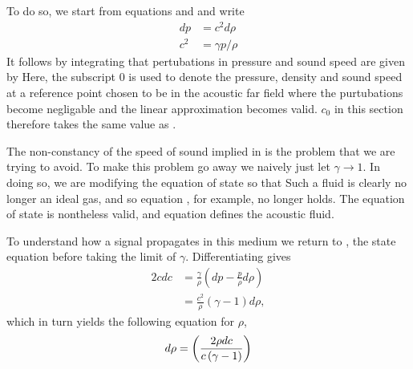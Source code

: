 To do so, we start from equations  and  and write
\begin{align}
  d p &= c^2 d\rho \label{eqn:soundSpeedDiffNR} \\
  c^2 &= \gamma p / \rho \label{eqn:idealGasSoundSpeed}
\end{align}
It follows by integrating that pertubations in pressure and sound speed are given by
Here, the subscript $0$ is used to denote the pressure, density and sound speed at a reference point
chosen to be in the acoustic far field where the purtubations become negligable and the linear approximation becomes valid.
$c_0$ in this section therefore takes the same value as .

The non-constancy of the speed of sound implied in  is the problem that we are trying to avoid.
To make this problem go away we naively just let $\gamma \rightarrow 1$.
In doing so, we are modifying the equation of state so that
Such a fluid is clearly no longer an ideal gas, and so equation , for example, no longer holds.
The equation of state is nontheless valid, and equation  defines the acoustic fluid.



To understand how a signal propagates in this medium we return to ,
the state equation before taking the limit of $\gamma$.
Differentiating   gives
\begin{align}
2 c dc &= \frac{\gamma}{\rho} \left(dp - \frac{p}{\rho}d\rho\right)  \\
       &= \frac{c^2}{\rho}\left(\gamma-1\right) d\rho,
\end{align}
which in turn yields the following equation for $\rho$,
\begin{align}
d\rho = \left(\frac{2\rho dc}{c\lr{\gamma - 1}}\right) %
\end{align}

